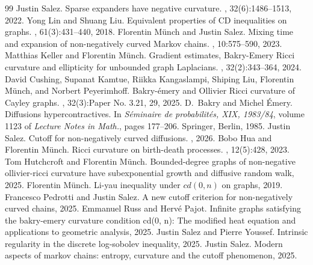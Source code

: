 \documentclass[10pt,a4paper]{amsart}
\begin{document}
\begin{thebibliography}{99}
 Justin Salez. \newblock Sparse expanders have negative curvature. , 32(6):1486--1513, 2022.
 Yong Lin and Shuang Liu. \newblock Equivalent properties of {CD} inequalities on graphs. , 61(3):431--440, 2018.
 Florentin M\"unch and Justin Salez. \newblock Mixing time and expansion of non-negatively curved {M}arkov chains. , 10:575--590, 2023.
 Matthias Keller and Florentin M\"unch. \newblock Gradient estimates, {B}akry-{E}mery {R}icci curvature and ellipticity for unbounded graph {L}aplacians. , 32(2):343--364, 2024.
 David Cushing, Supanat Kamtue, Riikka Kangaslampi, Shiping Liu, Florentin M\"unch, and Norbert Peyerimhoff. \newblock Bakry-\'emery and {O}llivier {R}icci curvature of {C}ayley graphs. , 32(3):Paper No. 3.21, 29, 2025.
 D.~Bakry and Michel \'Emery. \newblock Diffusions hypercontractives. \newblock In {\em S\'eminaire de probabilit\'es, {XIX}, 1983/84}, volume 1123 of {\em Lecture Notes in Math.}, pages 177--206. Springer, Berlin, 1985.
 Justin Salez. \newblock Cutoff for non-negatively curved diffusions. , 2026.
 Bobo Hua and Florentin M{\"u}nch. \newblock Ricci curvature on birth-death processes. , 12(5):428, 2023.
 Tom Hutchcroft and Florentin Münch. \newblock Bounded-degree graphs of non-negative ollivier-ricci curvature have subexponential growth and diffusive random walk, 2025.
 Florentin Münch. \newblock Li-yau inequality under $cd(0,n)$ on graphs, 2019.
 Francesco Pedrotti and Justin Salez. \newblock A new cutoff criterion for non-negatively curved chains, 2025.
 Emmanuel Russ and Hervé Pajot. \newblock Infinite graphs satisfying the bakry-emery curvature condition cd(0, n): The modified heat equation and applications to geometric analysis, 2025.
 Justin Salez and Pierre Youssef. \newblock Intrinsic regularity in the discrete log-sobolev inequality, 2025.
 Justin Salez. \newblock Modern aspects of markov chains: entropy, curvature and the cutoff phenomenon, 2025.
\end{thebibliography}
\end{document}
